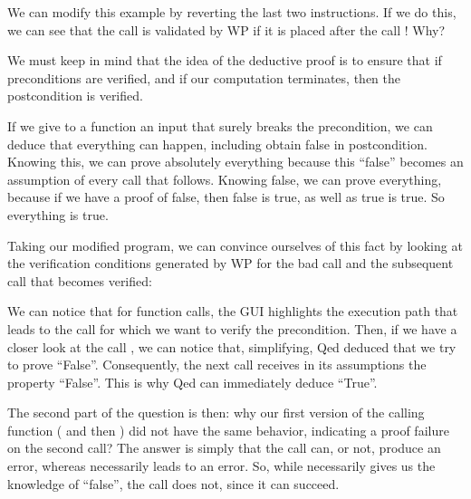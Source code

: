 

We can modify this example by reverting the last two instructions. If we
do this, we can see that the call  is validated by WP if
it is placed after the call ! Why?



We must keep in mind that the idea of the deductive proof is to ensure
that if preconditions are verified, and if our computation terminates,
then the postcondition is verified.



If we give to a function an input that surely breaks the precondition, we can
deduce that everything can happen, including obtain false in postcondition.
Knowing this, we can prove absolutely
everything because this ``false'' becomes an assumption of every call
that follows. Knowing false, we can prove everything, because if we have
a proof of false, then false is true, as well as true is true. So
everything is true.



Taking our modified program, we can convince ourselves of this fact by
looking at the verification conditions generated by WP for the bad call and the
subsequent call that becomes verified:







We can notice that for function calls, the GUI highlights the execution
path that leads to the call for which we want to verify the precondition.
Then, if we have a closer look at the call , we
can notice that, simplifying, Qed deduced that we try to prove
``False''. Consequently, the next call  receives in its
assumptions the property ``False''. This is why Qed can immediately
deduce ``True''.



The second part of the question is then: why our first version of the
calling function ( and then ) did
not have the same behavior, indicating a proof failure on the second
call? The answer is simply that the call  can, or not,
produce an error, whereas  necessarily leads to an
error. So, while  necessarily gives us the
knowledge of ``false'', the call  does not, since it can
succeed.



